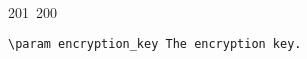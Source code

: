 201~200~\documentclass{article}
\begin{document}
\begin{lstlisting}[language=Python, caption=Encrypting a Message with ChaCha20-Poly1305]
	                                                                                                                                                                                                                                                                                                	                                                                                                                                        	    	                                                                                                	                                                                                                                                                                                                                                                                                                                                	                                                                        	                                                                        	                                                                                                                                        	                                                                                                                                                                                                                        	                                                                                                                            	                                                                	                                                                                                                \param encryption_key The encryption key.

\end{lstlisting}
\end{document}
